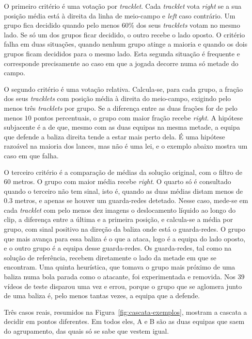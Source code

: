 O primeiro critério é uma votação por \emph{tracklet}. Cada \emph{tracklet} vota \emph{right} se
a sua posição média está à direita da linha de meio-campo e \emph{left} caso contrário. Um grupo
fica decidido quando pelo menos $60\%$ dos seus \emph{tracklets} votam no mesmo lado. Se só um
dos grupos ficar decidido, o outro recebe o lado oposto. O critério falha em duas situações,
quando nenhum grupo atinge a maioria e quando os dois grupos ficam decididos para o mesmo lado.
Esta segunda situação é frequente e corresponde precisamente ao caso em que a jogada decorre numa
só metade do campo.

O segundo critério é uma votação relativa. Calcula-se, para cada grupo, a fração dos seus
\emph{tracklets} com posição média à direita do meio-campo, exigindo pelo menos três
\emph{tracklets} por grupo. Se a diferença entre as duas frações for de pelo menos $10$ pontos
percentuais, o grupo com maior fração recebe \emph{right}. A hipótese subjacente é a de que,
mesmo com as duas equipas na mesma metade, a equipa que defende a baliza direita tende a estar
mais perto dela. É uma hipótese razoável na maioria dos lances, mas não é uma lei, e o exemplo
abaixo mostra um caso em que falha.

O terceiro critério é a comparação de médias da solução original, com o filtro de $60$ metros. O
grupo com maior média recebe \emph{right}. O quarto só é consultado quando o terceiro não tem
sinal, isto é, quando as duas médias distam menos de $0.3$ metros, e apenas se houver um
guarda-redes detetado. Nesse caso, mede-se em cada \emph{tracklet} com pelo menos dez imagens o
deslocamento líquido ao longo do clip, a diferença entre a última e a primeira posição, e
calcula-se a média por grupo, com sinal positivo na direção da baliza onde está o guarda-redes.
O grupo que mais avança para essa baliza é o que a ataca, logo é a equipa do lado oposto, e o
outro grupo é a equipa desse guarda-redes. Os guarda-redes, tal como na solução de referência,
recebem diretamente o lado da metade em que se encontram. Uma quinta heurística, que tomava o grupo
mais próximo de uma baliza numa bola parada como o atacante, foi experimentada e removida. Nos $39$
vídeos de teste disparou uma vez e errou, porque o grupo que se aglomera junto de uma baliza é,
pelo menos tantas vezes, a equipa que a defende.

Três casos reais, resumidos na Figura~\ref{fig:cascata-exemplos}, mostram a cascata a decidir em
pontos diferentes. Em todos eles, A e B são as duas equipas que saem do agrupamento, das quais só
se sabe que vestem igual.

